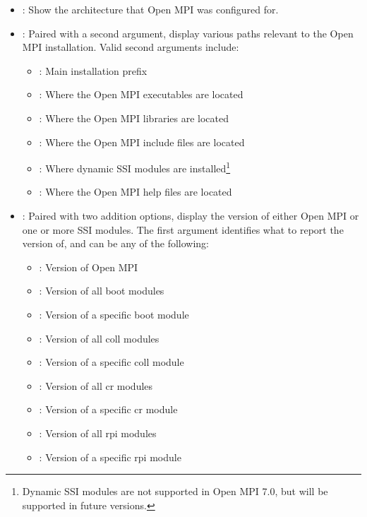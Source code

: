 \begin{itemize}
\item {}: Show the architecture that Open MPI was configured
  for.

\item {}: Paired with a second argument, display various
  paths relevant to the Open MPI installation.  Valid second arguments
  include: 

  \begin{itemize}
  \item {}: Main installation prefix
  \item {}: Where the Open MPI executables are located
  \item {}: Where the Open MPI libraries are located
  \item {}: Where the Open MPI include files are located
  \item {}: Where dynamic SSI modules are
    installed\footnote{Dynamic SSI modules are not supported in
      Open MPI 7.0, but will be supported in future versions.}
  \item {}: Where the Open MPI help files are located
  \end{itemize}

\item {}: Paired with two addition options, display the
  version of either Open MPI or one or more SSI modules.  The first
  argument identifies what to report the version of, and can be any of
  the following:

  \begin{itemize}
  \item {}: Version of Open MPI
  \item {}: Version of all boot modules
  \item {}: Version of a specific boot module
  \item {}: Version of all coll modules
  \item {}: Version of a specific coll module
  \item {}: Version of all cr modules
  \item {}: Version of a specific cr module
  \item {}: Version of all rpi modules
  \item {}: Version of a specific rpi module
  \end{itemize}


\end{itemize}

